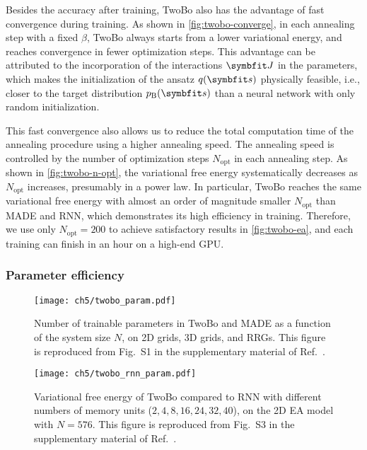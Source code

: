 Besides the accuracy after training, TwoBo also has the advantage of fast convergence during training. As shown in \cref{fig:twobo-converge}, in each annealing step with a fixed $\beta$, TwoBo always starts from a lower variational energy, and reaches convergence in fewer optimization steps. This advantage can be attributed to the incorporation of the interactions $\mJ$ in the parameters, which makes the initialization of the ansatz $q(\vs)$ physically feasible, i.e., closer to the target distribution $p_\text{B}(\vs)$ than a neural network with only random initialization.

This fast convergence also allows us to reduce the total computation time of the annealing procedure using a higher annealing speed. The annealing speed is controlled by the number of optimization steps $N_\text{opt}$ in each annealing step. As shown in \cref{fig:twobo-n-opt}, the variational free energy systematically decreases as $N_\text{opt}$ increases, presumably in a power law. In particular, TwoBo reaches the same variational free energy with almost an order of magnitude smaller $N_\text{opt}$ than MADE and RNN, which demonstrates its high efficiency in training. Therefore, we use only $N_\text{opt} = 200$ to achieve satisfactory results in \cref{fig:twobo-ea}, and each training can finish in an hour on a high-end GPU.

\subsubsection{Parameter efficiency}

\begin{figure}[htb]
\centering
\texttt{[image: ch5/twobo\_param.pdf]}
\caption[Number of parameters vs.\ system size for TwoBo and MADE]{
Number of trainable parameters in TwoBo and MADE as a function of the system size $N$, on 2D grids, 3D grids, and RRGs.
This figure is reproduced from Fig.~S1 in the supplementary material of Ref.~\cite{biazzo2024sparse}.
}
\label{fig:twobo-param}
\end{figure}

\begin{figure}[htb]
\centering
\texttt{[image: ch5/twobo\_rnn\_param.pdf]}
\caption[Variational free energy vs.\ number of parameters for TwoBo and RNN]{
Variational free energy of TwoBo compared to RNN with different numbers of memory units ($2, 4, 8, 16, 24, 32, 40$), on the 2D EA model with $N = 576$.
This figure is reproduced from Fig.~S3 in the supplementary material of Ref.~\cite{biazzo2024sparse}.
}
\label{fig:twobo-rnn-param}
\end{figure}

